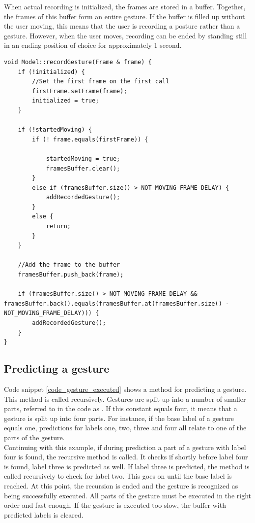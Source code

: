 When actual recording is initialized, the frames are stored in a buffer. Together, the frames of this buffer form an entire gesture. If the buffer is filled up without the user moving, this means that the user is recording a posture rather than a gesture. However, when the user moves, recording can be ended by standing still in an ending position of choice for approximately 1 second.\\

\begin{lstlisting}[caption=method to record a gesture, label=code_record_gesture]
void Model::recordGesture(Frame & frame) {
	if (!initialized) {
		//Set the first frame on the first call
		firstFrame.setFrame(frame);
		initialized = true;
	}

	if (!startedMoving) {
		if (! frame.equals(firstFrame)) {
		
			startedMoving = true;
			framesBuffer.clear();
		}
		else if (framesBuffer.size() > NOT_MOVING_FRAME_DELAY) {
			addRecordedGesture();
		}
		else {
			return;
		}
	}
	
	//Add the frame to the buffer
	framesBuffer.push_back(frame);

	if (framesBuffer.size() > NOT_MOVING_FRAME_DELAY &&	framesBuffer.back().equals(framesBuffer.at(framesBuffer.size() - NOT_MOVING_FRAME_DELAY))) {
		addRecordedGesture();
	}
}
\end{lstlisting}


\subsection{Predicting a gesture}

Code snippet \ref{code_gesture_executed} shows a method for predicting a gesture. This method is called recursively. Gestures are split up into a number of smaller parts, referred to in the code as . If this constant equals four, it means that a gesture is split up into four parts. For instance, if the base label of a gesture equals one, predictions for labels one, two, three and four all relate to one of the parts of the gesture.\\

Continuing with this example, if during prediction a part of a gesture with label four is found, the recursive method  is called. It checks if shortly before label four is found, label three is predicted as well. If label three is predicted, the method is called recursively to check for label two. This goes on until the base label is reached. At this point, the recursion is ended and the gesture is recognized as being successfully executed. All parts of the gesture must be executed in the right order and fast enough. If the gesture is executed too slow, the buffer with predicted labels is cleared.\\

